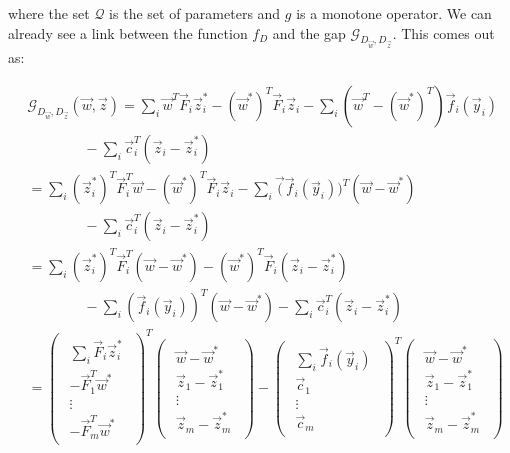 where the set $\mathcal{Q}$ is the set of parameters and $g$ is a monotone
operator. We can already see a link between the function $f_D$ and the gap
$\mathcal{G}_{D_{\vec w}, D_{\vec z}}$. This comes out as:

\begin{align}
    &\mathcal{G}_{D_{\vec w},D_{\vec z}}(\vec w, \vec z) = \sum_i \vec w^T \vec F_i \vec z_i^* - (\vec w^*)^T \vec F_i \vec z_i - \sum_i (\vec w^T - (\vec w^*)^T ) \vec f_i (\vec y_i)\\
    &\quad\quad\quad\quad- \sum_i \vec c_i^T (\vec z_i - \vec z_i^*)\\
    &= \sum_i (\vec z_i^*)^T \vec F_i^T \vec w - (\vec w^*)^T \vec F_i \vec z_i - \sum_i \vec (\vec f_i (\vec y_i))^T (\vec w - \vec w^*)\\
    &\quad\quad\quad\quad- \sum_i \vec c_i^T (\vec z_i - \vec z_i^*)\\
    &= \sum_i (\vec z_i^*)^T \vec F_i^T (\vec w - \vec w^*) - (\vec w^*)^T \vec F_i (\vec z_i - \vec z_i^*)\\
    &\quad\quad\quad\quad- \sum_i (\vec f_i(\vec y_i))^T (\vec w - \vec w^*) - \sum_i \vec c_i^T (\vec z_i - \vec z_i^*)\\
    &=
    \begin{pmatrix}
      \begin{array}{c}
        \sum_i \vec F_i \vec z_i^*\\
	-\vec F_1^T \vec w^*\\
	\vdots\\
	-\vec F_m^T \vec w^*
      \end{array}
    \end{pmatrix}^T
    \begin{pmatrix}
      \begin{array}{c}
	\vec w - \vec w^*\\
	\vec z_1 - \vec z_1^*\\
	\vdots\\
	\vec z_m - \vec z_m^*
      \end{array}
    \end{pmatrix} -
    \begin{pmatrix}
      \begin{array}{c}
	\sum_i \vec f_i(\vec y_i)\\
	\vec c_1\\
	\vdots\\
	\vec c_m
      \end{array}
    \end{pmatrix}^T
    \begin{pmatrix}
      \begin{array}{c}
	\vec w - \vec w^*\\
	\vec z_1 - \vec z_1^*\\
	\vdots\\
	\vec z_m - \vec z_m^*
      \end{array}
    \end{pmatrix}
\end{align}
